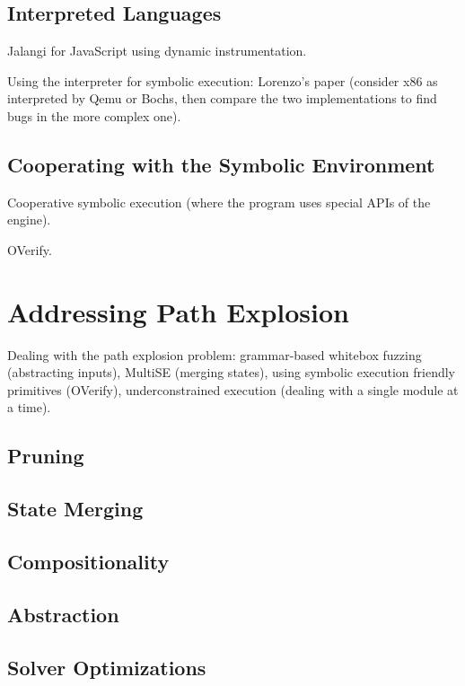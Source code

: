 \subsection{Interpreted Languages}

Jalangi for JavaScript using dynamic instrumentation.

Using the interpreter for symbolic execution: Lorenzo's paper (consider x86 as interpreted by Qemu or Bochs, then compare the two implementations to find bugs in the more complex one).

\subsection{Cooperating with the Symbolic Environment}

Cooperative symbolic execution (where the program uses special APIs of the engine).

OVerify.


\section{Addressing Path Explosion}
\label{sec:relwork:pathexpl}

Dealing with the path explosion problem: grammar-based whitebox fuzzing (abstracting inputs), MultiSE (merging states), using symbolic execution friendly primitives (OVerify), underconstrained execution (dealing with a single module at a time).

\subsection{Pruning}

\subsection{State Merging}

\subsection{Compositionality}

\subsection{Abstraction}

\subsection{Solver Optimizations}


